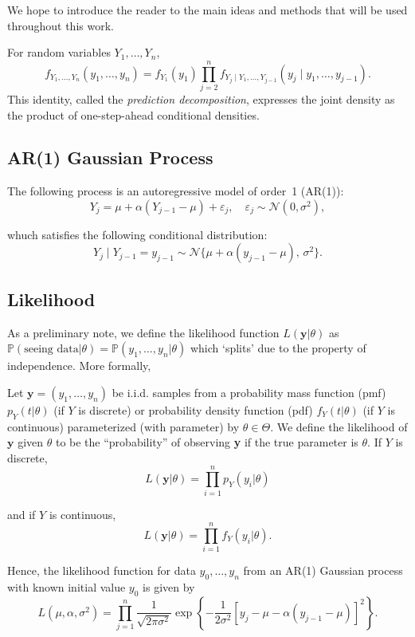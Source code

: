 We hope to introduce the reader to the main ideas and methods that will be used throughout this work.

\begin{definition}
    For random variables $Y_1,\dots,Y_n$,
    \[
    f_{Y_1,\dots,Y_n}(y_1,\dots,y_n)
    = f_{Y_1}(y_1)
    \prod_{j=2}^n f_{Y_j \mid Y_1,\dots,Y_{j-1}}(y_j \mid y_1,\dots,y_{j-1}).
    \]
    This identity, called the \emph{prediction decomposition}, expresses the joint density as the product of one-step-ahead conditional densities.
\end{definition}

\subsection{AR(1) Gaussian Process}
The following process is an autoregressive model of order~1 (AR(1)):
$$Y_j = \mu + \alpha(Y_{j-1}-\mu) + \varepsilon_j, \quad \varepsilon_j \sim \mathcal{N}(0,\sigma^2),$$

whuch satisfies the following conditional distribution:
$$Y_j \mid Y_{j-1}=y_{j-1} \sim \mathcal{N}\{\mu+\alpha(y_{j-1}-\mu),\,\sigma^2\}.$$

\subsection{Likelihood}
As a preliminary note, we define the likelihood function $L(\textbf{y} | \theta)$ as $\mathbb{P}(\text{seeing data} | \theta) = \mathbb{P}(y_1, \ldots, y_n | \theta)$ which
`splits' due to the property of independence. More formally,

\begin{definition}[Likelihood]
    Let $\textbf{y} = (y_1, \ldots, y_n)$ be i.i.d. samples from a probability mass function (pmf) $p_{Y}(t | \theta)$ (if $Y$ is discrete) or probability density
    function (pdf) $f_{Y}(t | \theta)$ (if $Y$ is continuous) parameterized (with parameter) by $\theta \in \Theta$. We define
    the likelihood of $\textbf{y}$ given $\theta$ to be the “probability” of observing \textbf{y} if the true parameter is $\theta$.
    If $Y$ is discrete,
    $$L(\textbf{y}| \theta) = \prod_{i=1}^{n}p_{Y}(y_i | \theta)$$

    and if $Y$ is continuous,
    $$L(\textbf{y}| \theta) = \prod_{i=1}^{n}f_{Y}(y_i | \theta).$$

\end{definition}

Hence, the likelihood function for data $y_0,\ldots,y_n$ from an AR(1) Gaussian process with known initial value $y_0$ is given by
\[
L(\mu,\alpha,\sigma^2) = \prod_{j=1}^n \frac{1}{\sqrt{2\pi\sigma^2}} \exp\left\{-\frac{1}{2\sigma^2}[y_j - \mu - \alpha(y_{j-1}-\mu)]^2\right\}.
\]

